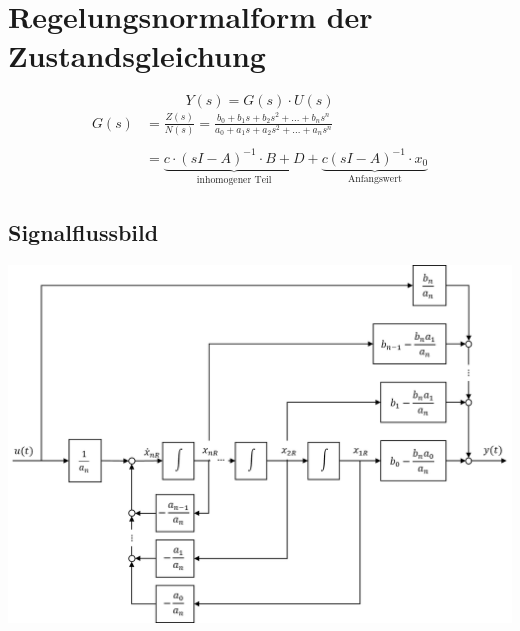 



\section{Regelungsnormalform der Zustandsgleichung}
\[
	Y(s) = G(s) \cdot U(s)
\]
\[\begin{aligned}
	G(s) &= \frac{Z(s)}{N(s)} = \frac{b_0+b_1s+b_2s^2+...+b_ns^n}{a_0+a_1s+a_2s^2+...+a_ns^n} \\\\
	&=\underbrace{c\cdot(sI-A)^{-1}\cdot B +D}_{\text{inhomogener Teil}} + \underbrace{c(sI-A)^{-1}\cdot x_0}_{\text{Anfangswert}}
\end{aligned}\]
\subsection{Signalflussbild}
\begin{center}
	\includegraphics[scale = 0.5]{images/RNF_Signalflussblid.png}
\end{center}

